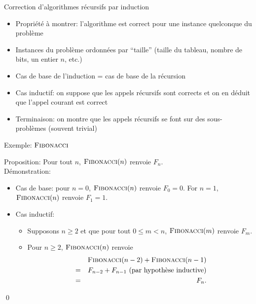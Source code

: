 \begin{frame}{Correction d'algorithmes récursifs par induction}
\begin{itemize}
\item Propriété à montrer: l'algorithme est correct pour une instance quelconque du problème
\item Instances du problème ordonnées par ``taille'' (taille du tableau, nombre de bits, un entier $n$, etc.)
\item Cas de base de l'induction = cas de base de la récursion
\item Cas inductif: on suppose que les appels récursifs sont corrects et on en déduit que l'appel courant est correct
\item Terminaison: on montre que les appels récursifs se font sur des sous-problèmes (souvent trivial)
\end{itemize}
\end{frame}

\begin{frame}{Exemple: $\textnormal{\scshape Fibonacci}$}

\begin{center}\small
{}
\end{center}


Proposition: Pour tout $n$, $\textnormal{\scshape Fibonacci}(n)$ renvoie $F_n$.\\

Démonstration:
\begin{itemize}
\item Cas de base: pour $n=0$, $\textnormal{\scshape Fibonacci}(n)$ renvoie $F_0=0$. For $n=1$, $\textnormal{\scshape Fibonacci}(n)$ renvoie $F_1=1$.
\item Cas inductif:
\begin{itemize}
\item Supposons $n\geq 2$ et que pour tout $0\leq m< n$, $\textnormal{\scshape Fibonacci}(m)$ renvoie $F_m$.
\item Pour $n\geq 2$, $\textnormal{\scshape Fibonacci}(n)$ renvoie
\begin{eqnarray*}
&&\textnormal{\scshape Fibonacci}(n-2)+\textnormal{\scshape Fibonacci}(n-1)\\
&=& F_{n-2}+F_{n-1} \mbox{ (par hypothèse inductive)}\\
&=& F_n.
\end{eqnarray*}
\end{itemize}
\end{itemize}\qed

\end{frame}


